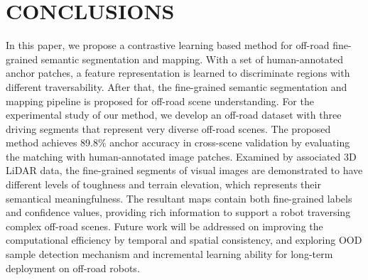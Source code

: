 \documentclass[letterpaper, 10 pt, conference]{ieeeconf}  %
\begin{document}
	\section{CONCLUSIONS}	\label{conclusions}
	In this paper, we propose a contrastive learning based method for off-road fine-grained semantic segmentation and mapping. With a set of human-annotated anchor patches, a feature representation is learned to discriminate regions with different traversability. After that, the fine-grained semantic segmentation and mapping pipeline is proposed for off-road scene understanding.
	For the experimental study of our method, we develop an off-road dataset with three driving segments that represent very diverse off-road scenes. The proposed method achieves 89.8\% anchor accuracy in cross-scene validation by evaluating the matching with human-annotated image patches.
	Examined by associated 3D LiDAR data, the fine-grained segments of visual images are demonstrated to have different levels of toughness and terrain elevation, which represents their semantical meaningfulness.
	The resultant maps contain both fine-grained labels and confidence values, providing rich information to support a robot traversing complex off-road scenes.
	Future work will be addressed on improving the computational efficiency by temporal and spatial consistency, and exploring OOD sample detection mechanism and incremental learning ability for long-term deployment on off-road robots.
	
	
	
	
	
\end{document}
